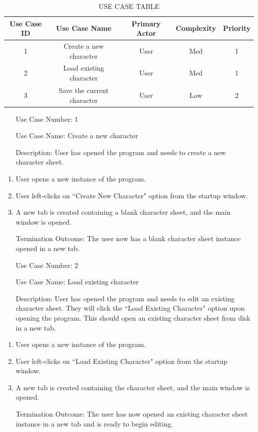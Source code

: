 \documentclass[10pt,conference,onecolumn,compsoc]{IEEEtran}
\begin{document}
\begin{table}[h]
\centering
\begin{tabular}{|c|c|c|c|c|}
\hline
Use Case ID & Use Case Name & Primary Actor & Complexity & Priority \\
\hline \hline
1 & Create a new character & User & Med & 1\\
\hline
2 & Load existing character & User & Med & 1\\
\hline
3 & Save the current character & User & Low & 2\\
\hline

\end{tabular}
\caption{USE CASE TABLE}
\label{tab:useCaseIndex}
\end{table}


\begin{itemize}
\item[Use Case Number:] 1
\item[Use Case Name:] Create a new character
\item[Description:] User has opened the program and needs to create a new character sheet. 
\end{itemize}

\begin{enumerate}
\item User opens a new instance of the program.
\item User left-clicks on ``Create New Character" option from the startup window.
\item A new tab is created containing a blank character sheet, and the main window is opened.
\item[Termination Outcome:] The user now has a blank character sheet instance opened in a new tab.
\end{enumerate}

\begin{itemize}
\item[Use Case Number:] 2
\item[Use Case Name:] Load existing character
\item[Description:] User has opened the program and needs to edit an existing character sheet. They will click the ``Load Existing Character" option upon opening the program. This should open an existing character sheet from disk in a new tab. 
\end{itemize}

\begin{enumerate}
\item User opens a new instance of the program.
\item User left-clicks on ``Load Existing Character" option from the startup window.
\item A new tab is created containing the character sheet, and the main window is opened.
\item[Termination Outcome:] The user has now opened an existing character sheet instance in a new tab and is ready to begin editing.
\end{enumerate}
\end{document}
